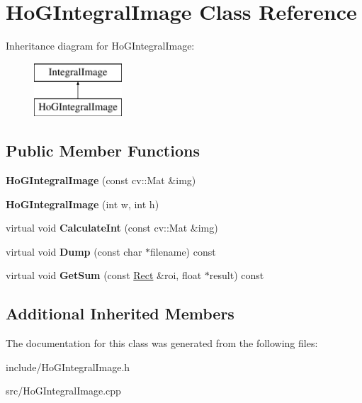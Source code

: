 \hypertarget{classHoGIntegralImage}{}\section{Ho\+G\+Integral\+Image Class Reference}
\label{classHoGIntegralImage}
Inheritance diagram for Ho\+G\+Integral\+Image\+:\begin{figure}[H]
\begin{center}
\leavevmode
\includegraphics[height=2.000000cm]{classHoGIntegralImage}
\end{center}
\end{figure}
\subsection*{Public Member Functions}
\begin{DoxyCompactItemize}
\item 
\hypertarget{classHoGIntegralImage_a3005a86adb82824baa52194dc7263e04}{}{\bfseries Ho\+G\+Integral\+Image} (const cv\+::\+Mat \&img)\label{classHoGIntegralImage_a3005a86adb82824baa52194dc7263e04}

\item 
\hypertarget{classHoGIntegralImage_a8f177c758e21a588d4f872f7f7ebcb44}{}{\bfseries Ho\+G\+Integral\+Image} (int w, int h)\label{classHoGIntegralImage_a8f177c758e21a588d4f872f7f7ebcb44}

\item 
\hypertarget{classHoGIntegralImage_aede37af7488a0b63b9516dab670fdee5}{}virtual void {\bfseries Calculate\+Int} (const cv\+::\+Mat \&img)\label{classHoGIntegralImage_aede37af7488a0b63b9516dab670fdee5}

\item 
\hypertarget{classHoGIntegralImage_adce78ee5a0130a0133e2cf2589304ff9}{}virtual void {\bfseries Dump} (const char $\ast$filename) const \label{classHoGIntegralImage_adce78ee5a0130a0133e2cf2589304ff9}

\item 
\hypertarget{classHoGIntegralImage_a57eef64a949491e3cb9a3e37d4710e11}{}virtual void {\bfseries Get\+Sum} (const \hyperlink{classRect}{Rect} \&roi, float $\ast$result) const \label{classHoGIntegralImage_a57eef64a949491e3cb9a3e37d4710e11}

\end{DoxyCompactItemize}
\subsection*{Additional Inherited Members}


The documentation for this class was generated from the following files\+:\begin{DoxyCompactItemize}
\item 
include/Ho\+G\+Integral\+Image.\+h\item 
src/Ho\+G\+Integral\+Image.\+cpp\end{DoxyCompactItemize}
